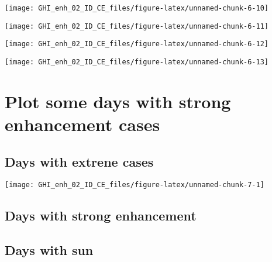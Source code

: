 \documentclass[
  10pt,
  a4paper,oneside]{article}
\begin{document}
\begin{center}\texttt{[image: GHI\_enh\_02\_ID\_CE\_files/figure-latex/unnamed-chunk-6-10]} \end{center}

\begin{center}\texttt{[image: GHI\_enh\_02\_ID\_CE\_files/figure-latex/unnamed-chunk-6-11]} \end{center}

\begin{center}\texttt{[image: GHI\_enh\_02\_ID\_CE\_files/figure-latex/unnamed-chunk-6-12]} \end{center}

\begin{center}\texttt{[image: GHI\_enh\_02\_ID\_CE\_files/figure-latex/unnamed-chunk-6-13]} \end{center}

\FloatBarrier

\hypertarget{plot-some-days-with-strong-enhancement-cases}{%
\section{Plot some days with strong enhancement cases}\label{plot-some-days-with-strong-enhancement-cases}}

\FloatBarrier

\hypertarget{days-with-extrene-cases}{%
\subsection{Days with extrene cases}\label{days-with-extrene-cases}}

\begin{center}\texttt{[image: GHI\_enh\_02\_ID\_CE\_files/figure-latex/unnamed-chunk-7-1]} \end{center}

\FloatBarrier

\hypertarget{days-with-strong-enhancement}{%
\subsection{Days with strong enhancement}\label{days-with-strong-enhancement}}

\FloatBarrier

\hypertarget{days-with-sun}{%
\subsection{Days with sun}\label{days-with-sun}}
\end{document}
